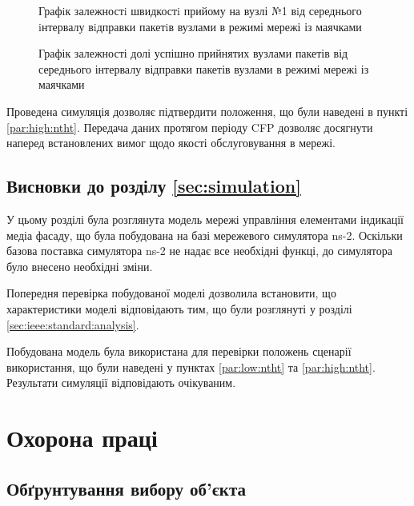 \documentclass[a4paper,ukrainian,utf8,nocolumnsxix,floatsection,equationsection]{eskdtext}
\let\stdsection\section
\renewcommand\section{\clearpage\stdsection}
\begin{document}
\begin{figure}[h]
	\centering
	\caption{\label{fig:result_test_backtraf_beac_brd_tp1}Графiк залежностi швидкостi прийому на вузлі №1 вiд середнього iнтервалу вiдправки пакетiв вузлами в режимі мережі із маячками}
\end{figure}

\begin{figure}[h]
	\centering
	\caption{\label{fig:result_test_backtraf_beac_brd_deliv}Графік залежності долі успішно прийнятих вузлами пакетів від середнього інтервалу відправки пакетів вузлами в режимі мережі із маячками}
\end{figure}


Проведена симуляція дозволяє підтвердити положення, що були наведені в пункті \ref{par:high:ntht}. Передача даних протягом періоду CFP дозволяє досягнути наперед встановлених вимог щодо якості обслуговування в мережі. 

\subsection{Висновки до розділу \ref{sec:simulation}}

У цьому розділі була розглянута модель мережі управління елементами індикації медіа фасаду, що була побудована на базі мережевого симулятора ns-2. Оскільки базова поставка симулятора ns-2 не надає все необхідні функці, до симулятора було внесено необхідні зміни.

Попередня перевірка побудованої моделі дозволила встановити, що характеристики моделі відповідають тим, що були розглянуті у розділі \ref{sec:ieee:standard:analysis}. 

Побудована модель була використана для перевірки положень сценарії використання, що були наведені у пунктах \ref{par:low:ntht} та \ref{par:high:ntht}. Результати симуляції відповідають очікуваним. 


\section{Охорона праці}
\label{sec:work_safety}

\subsection{Обґрунтування вибору об’єкта}
\end{document}
